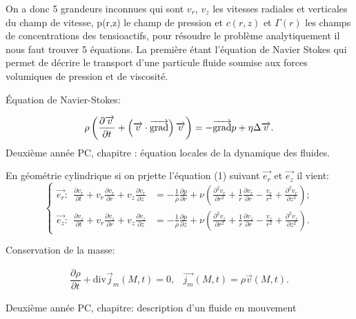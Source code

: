 \documentclass[french, 10pt]{article}
\begin{document}
On a donc 5 grandeurs inconnues qui sont $v_r$, $v_z$ les vitesses radiales et verticales du champ de vitesse, p(r,z) le champ de pression et $c(r,z)$ et $\Gamma(r)$ les champs de concentrations des tensioactifs, pour résoudre le problème analytiquement il nous faut trouver 5 équations. La première étant l'équation de Navier Stokes qui permet de décrire le transport d'une particule fluide soumise aux forces volumiques de pression et de viscosité. 

\begin{Programme}{Équation de Navier-Stokes:}
  
  \begin{equation}
    \rho\left(\dfrac{\partial \vec{v}}{\partial t}+\left(\vec{v}\cdot\vec{\rm grad}\right)\vec{v}\right)=-\vec{\rm grad}p+\eta\Delta\vec{v}.
  \end{equation}
  Deuxième année PC, chapitre : équation locales de la dynamique des fluides.
\end{Programme}

En géométrie cylindrique si on prjette l'équation (1) suivant $\vec{e_r}$ et $\vec{e_z}$ il vient: 
% 
\begin{equation}
  \left\{
    \begin{aligned}
      \vec{e_r}:~~ \frac{\partial v_r}{\partial t} +v_r\frac{\partial v_r}{\partial r} + v_z\frac{\partial v_r}{\partial z}&= -\frac{1}{\rho}\frac{\partial p}{\partial r} + \nu\left(\frac{\partial^2v_r}{\partial r^2}+ \frac{1}{r}\frac{\partial v_r}{\partial r} - \frac{v_r}{r^2}+\frac{\partial ^2 v_r}{\partial z^2}\right);\\
      \vec{e_z}:~~\frac{\partial v_z}{\partial t} +v_r\frac{\partial v_z}{\partial r} + v_z\frac{\partial v_z}{\partial z} &= -\frac{1}{\rho}\frac{\partial p}{\partial z} + \nu\left(\frac{\partial^2v_z}{\partial r^2}+ \frac{1}{r}\frac{\partial v_z}{\partial r} - \frac{v_z}{r^2}+\frac{\partial ^2 v_z}{\partial z^2}\right).\label{eq:NavierStokes}
   \end{aligned}
  \right.
\end{equation}

\begin{Programme}{Conservation de la masse:}
  
  \begin{equation}
    \begin{array}{cc}
   \dfrac{\partial \rho}{\partial t}+\text{div}\vec{j}_m(M,t)=0, & \vec{j_m}(M,t) = \rho \vec{v}(M,t).
    \end{array}
  \end{equation}

  Deuxième année PC, chapitre: description d'un fluide en mouvement
\end{Programme}
\end{document}
